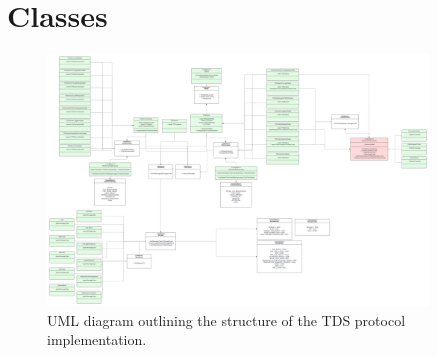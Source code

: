\documentclass[../design_doc.tex]{subfiles}
\begin{document}
\section{Classes}\label{sec:classes}
    \begin{figure}[h]
        \centering
        \includegraphics[width=0.9\textwidth]{uml_tds.png}
        \caption{UML diagram outlining the structure of the TDS protocol implementation.}\label{fig:tdsuml}
    \end{figure}
\end{document}

